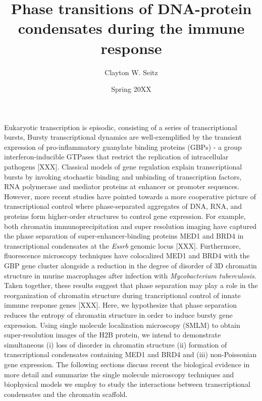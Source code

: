\documentclass{ucetd}
\title{Phase transitions of DNA-protein condensates during the immune response}
\author{Clayton W. Seitz}
\date{Spring 20XX}
\begin{document}
\maketitle

\makecopyright


\tableofcontents


\abstract

Eukaryotic transcription is episodic, consisting of a series of transcriptional bursts, Bursty transcriptional dynamics are well-exemplified by the transient expression of pro-inflammatory guanylate binding proteins (GBPs) - a group interferon-inducible GTPases that restrict the replication of intracellular pathogens [XXX]. Classical models of gene regulation explain transcriptional bursts by invoking stochastic binding and unbinding of transcription factors, RNA polymerase and mediator proteins at enhancer or promoter sequences. However, more recent studies have pointed towards a more cooperative picture of transcriptional control where phase-separated aggregates of DNA, RNA, and proteins form higher-order structures to control gene expression. For example, both chromatin immunoprecipitation and super resolution imaging have captured the phase separation of super-enhancer-binding proteins MED1 and BRD4 in transcriptional condensates at the \textit{Essrb} genomic locus [XXX]. Furthermore, fluorescence microscopy techniques have colocalized MED1 and BRD4 with the GBP gene cluster alongside a reduction in the degree of disorder of 3D chromatin structure in murine macrophages after infection with \textit{Mycobacterium tuberculosis}. Taken together, these results suggest that phase separation may play a role in the reorganization of chromatin structure during trancriptional control of innate immune response genes [XXX]. Here, we hypothesize that phase separation reduces the entropy of chromatin structure in order to induce bursty gene expression. Using single molecule localization microscopy (SMLM) to obtain super-resolution images of the H2B protein, we intend to demonstrate simultaneous (i) loss of disorder in chromatin structure (ii) formation of transcriptional condensates containing MED1 and BRD4 and (iii) non-Poissonian gene expression. The following sections discuss recent the biological evidence in more detail and summarize the single molecule microscopy techniques and biophysical models we employ to study the interactions between transcriptional condensates and the chromatin scaffold.
\end{document}
